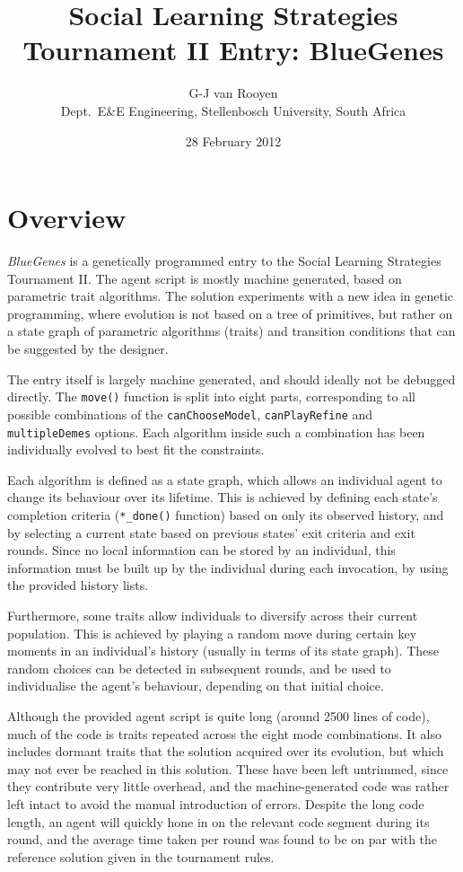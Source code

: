 \documentclass[a4paper,10pt]{article}
\title{Social Learning Strategies Tournament II Entry: BlueGenes}
\author{G-J van Rooyen\\
{\footnotesize Dept.\ E\&E Engineering, Stellenbosch University, South Africa}}
\date{28 February 2012}
\begin{document}
\maketitle

\section{Overview}
\emph{BlueGenes} is a genetically programmed entry to the Social Learning Strategies Tournament II\@.
The agent script is mostly machine generated, based on parametric trait algorithms.
The solution experiments with a new idea in genetic programming, where evolution is not based
on a tree of primitives, but rather on a state graph of parametric algorithms (traits) and transition conditions
that can be suggested by the designer.

The entry itself is largely machine generated, and should ideally not be debugged directly. The \texttt{move()}
function is split into eight parts, corresponding to all possible combinations of the \texttt{canChooseModel},
\texttt{canPlayRefine} and \texttt{multipleDemes} options. Each algorithm inside such a combination has been individually
evolved to best fit the constraints.

Each algorithm is defined as a state graph, which allows an individual agent to change its behaviour over its lifetime.
This is achieved by defining each state's completion criteria (\texttt{*\_done()} function) based on only its
observed history, and by selecting a current state based on previous states' exit criteria and exit rounds. Since no
local information can be stored by an individual, this information must be built up by the individual during each
invocation, by using the provided history lists.

Furthermore, some traits allow individuals to diversify across their current population. This is achieved by playing
a random move during certain key moments in an individual's history (usually in terms of its state graph). These
random choices can be detected in subsequent rounds, and be used to individualise the agent's behaviour, depending on
that initial choice.

Although the provided agent script is quite long (around 2500 lines of code), much of the code is traits repeated
across the eight mode combinations. It also includes dormant traits that the solution acquired over its evolution,
but which may not ever be reached in this solution. These have been left untrimmed, since they contribute very
little overhead, and the machine-generated code was rather left intact to avoid the manual introduction of errors.
Despite the long code length, an agent will quickly hone in on the relevant code segment during its round,
and the average time taken per round was found to be on par with the reference solution given in the tournament rules.
\end{document}
